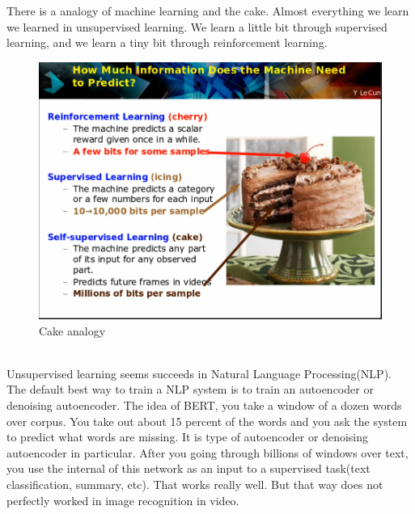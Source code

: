 \documentclass{article}
\begin{document}
There is a analogy of machine learning and the cake. Almost everything we learn we learned in unsupervised learning. We learn a little bit through supervised learning, and we learn a tiny bit through reinforcement learning. \\
\begin{figure}[ht]
\centering
\includegraphics[scale=0.6]{cake.png}
\caption{Cake analogy}
\label{fig:label}
\end{figure}
\\

Unsupervised learning seems succeeds in Natural Language Processing(NLP). The default best way to train a NLP system is to train an autoencoder or denoising autoencoder. The idea of BERT, you take a window of a dozen words over corpus. You take out about 15 percent of the words and you ask the system to predict what words are missing. It is type of autoencoder or denoising autoencoder in particular. After you going through billions of windows over text, you use the internal of this network as an input to a supervised task(text classification, summary, etc). That works really well. But that way does not perfectly worked in image recognition in video. \\ \\
\end{document}
